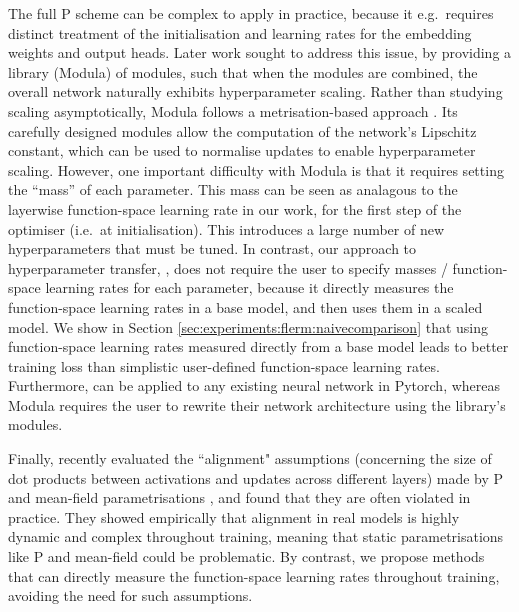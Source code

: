 The full \textmu{}P scheme can be complex to apply in practice, because it e.g.\ requires distinct treatment of the initialisation and learning rates for the embedding weights and output heads.
Later work \citep{large2024scalableoptimizationmodularnorm} sought to address this issue, by providing a library (Modula) of modules, such that when the modules are combined, the overall network naturally exhibits hyperparameter scaling. Rather than studying scaling asymptotically, Modula follows a metrisation-based approach \citep[for other metrisation works, see e.g.][]{yang2024spectralconditionfeaturelearning,bernstein2021distanceneuralnetworksstability, bernstein2024modulardualitydeeplearning, bernstein2024oldoptimizernewnorm}. Its carefully designed modules allow the computation of the network's Lipschitz constant, which can be used to normalise updates to enable hyperparameter scaling.
However, one important difficulty with Modula is that it requires setting the ``mass'' of each parameter.
This mass can be seen as analagous to the layerwise function-space learning rate in our work, for the first step of the optimiser (i.e.\ at initialisation).
This introduces a large number of new hyperparameters that must be tuned.
In contrast, our approach to hyperparameter transfer, \flerm{}, does not require the user to specify masses / function-space learning rates for each parameter, because it directly measures the function-space learning rates in a base model, and then uses them in a scaled model. We show in Section \ref{sec:experiments:flerm:naivecomparison} that using function-space learning rates measured directly from a base model leads to better training loss than simplistic user-defined function-space learning rates.
Furthermore, \flerm{} can be applied to any existing neural network in Pytorch, whereas Modula requires the user to rewrite their network architecture using the library's modules.

Finally, \citet{everett2024scalingexponentsparameterizationsoptimizers} recently evaluated the ``alignment" assumptions (concerning the size of dot products between activations and updates across different layers) made by \textmu{}P and mean-field parametrisations \citep{yang2022featurelearninginfinitewidthneural,Mei_2018,bordelon2022selfconsistentdynamicalfieldtheory}, and found that they are often violated in practice. They showed empirically that alignment in real models is highly dynamic and complex throughout training, meaning that static parametrisations like \textmu{}P and mean-field could be problematic.
By contrast, we propose methods that can directly measure the function-space learning rates throughout training, avoiding the need for such assumptions.